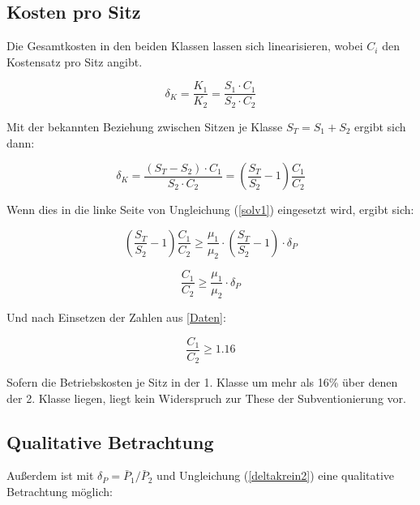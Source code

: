 \documentclass[a4paper,12pt]{article}
\begin{document}
\subsection{Kosten pro Sitz}

Die Gesamtkosten in den beiden Klassen lassen sich linearisieren, wobei $C_i$ den Kostensatz pro Sitz angibt. 

\begin{equation}
\delta_K = \frac{K_1}{K_2} = \frac{S_1 \cdot C_1}{S_2 \cdot C_2}
\label{linearization}
\end{equation}

Mit der bekannten Beziehung zwischen Sitzen je Klasse $S_T = S_1 + S_2$ ergibt sich dann:

\begin{equation}
\delta_K = \frac{(S_T-S_2) \cdot C_1}{S_2 \cdot C_2} = \left(\frac{S_T}{S_2} - 1 \right) \frac{C_1}{C_2}
\label{linearizationeingesetzt}
\end{equation}

Wenn dies in die linke Seite von Ungleichung (\ref{solv1}) eingesetzt wird, ergibt sich:

\begin{equation}
\left(\frac{S_T}{S_2} - 1 \right) \frac{C_1}{C_2} \geq \frac{\mu_1}{\mu_2} \cdot  \left( \frac{S_T}{S_2 } - 1 \right) \cdot \delta_P
\label{deltakrein}
\end{equation}


\begin{equation}
\frac{C_1}{C_2} \geq  \frac{\mu_1}{\mu_2} \cdot  \delta_P
\label{deltakrein2}
\end{equation}

Und nach Einsetzen der Zahlen aus \ref{Daten}:


\begin{equation}
 \frac{C_1}{C_2} \geq 1.16 
\label{deltaknum}
\end{equation}

Sofern die Betriebskosten je Sitz in der 1. Klasse um mehr als 16\% über denen der 2. Klasse liegen, liegt kein Widerspruch zur These der Subventionierung vor.

\subsection{Qualitative Betrachtung}

Außerdem ist mit $\delta_P = \bar P_1/\bar P_2$ und Ungleichung (\ref{deltakrein2}) eine qualitative Betrachtung möglich:
\end{document}
